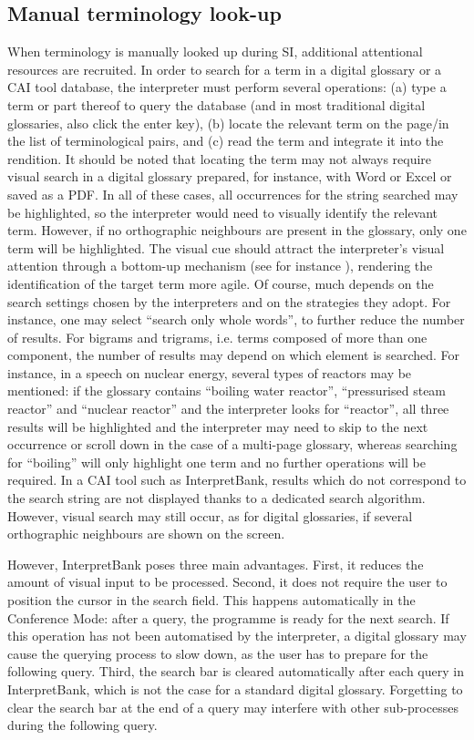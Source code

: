 \subsection{Manual terminology look-up} \label{manual_query}\largerpage
When terminology is manually looked up during SI, additional attentional resources are recruited. In order to search for a term in a digital glossary or a CAI tool database, the interpreter must perform several operations: (a) type a term or part thereof to query the database (and in most traditional digital glossaries, also click the enter key), (b) locate the relevant term on the page/in the list of terminological pairs, and (c) read the term and integrate it into the rendition. It should be noted that locating the term may not always require visual search in a digital glossary prepared, for instance, with Word or Excel or saved as a PDF. In all of these cases, all occurrences for the string searched may be highlighted, so the interpreter would need to visually identify the relevant term. However, if no orthographic neighbours are present in the glossary, only one term will be highlighted. The visual cue should attract the interpreter's visual attention through a bottom-up mechanism (see for instance \citealt{seubert_visuelle_2019}), rendering the identification of the target term more agile. Of course, much depends on the search settings chosen by the interpreters and on the strategies they adopt. For instance, one may select ``search only whole words'', to further reduce the number of results. For bigrams and trigrams, i.e. terms composed of more than one component, the number of results may depend on which element is searched. For instance, in a speech on nuclear energy, several types of reactors may be mentioned: if the glossary contains ``boiling water reactor'', ``pressurised steam reactor'' and ``nuclear reactor'' and the interpreter looks for ``reactor'', all three results will be highlighted and the interpreter may need to skip to the next occurrence or scroll down in the case of a multi-page glossary, whereas searching for ``boiling'' will only highlight one term and no further operations will be required. In a CAI tool such as InterpretBank, results which do not correspond to the search string are not displayed thanks to a dedicated search algorithm. However, visual search may still occur, as for digital glossaries, if several orthographic neighbours are shown on the screen.

However, InterpretBank poses three main advantages. First, it reduces the amount of visual input to be processed. Second, it does not require the user to position the cursor in the search field. This happens automatically in the Conference Mode: after a query, the programme is ready for the next search. If this operation has not been automatised by the interpreter, a digital glossary may cause the querying process to slow down, as the user has to prepare for the following query. Third, the search bar is cleared automatically after each query in InterpretBank, which is not the case for a standard digital glossary. Forgetting to clear the search bar at the end of a query may interfere with other sub-processes during the following query.

